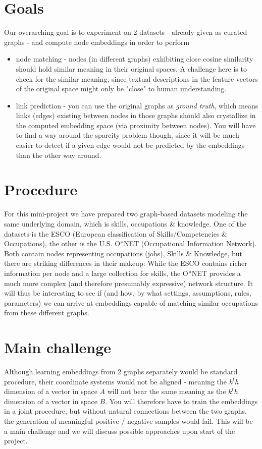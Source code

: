 \documentclass[review]{elsarticle}
\begin{document}
\section{Goals}
\label{sect:goals}

Our overarching goal is to experiment on 2 datasets - already given as curated graphs - and compute node embeddings in order to perform 

\begin{itemize}
  \item node matching - nodes (in different graphs) exhibiting close cosine similarity should hold similar meaning in their original spaces. A challenge here is to check for the similar meaning, since textual descriptions in the feature vectors of the original space might only be "close" to human understanding.
  \item link prediction - you can use the original graphs as \textit{ground truth}, which means links (edges) existing between nodes in those graphs should also crystallize in the computed embedding space (via proximity between nodes). You will have to find a way around the sparcity problem though, since it will be much easier to detect if a given edge would not be predicted by the embeddings than the other way around.
\end{itemize}


\section{Procedure}
\label{sect:procedure}

For this mini-project we have prepared two graph-based datasets modeling the same underlying domain, which is skills, occupations \& knowledge. One of the datasets is the ESCO (European classification of Skills/Competencies \& Occupations), the other is the U.S. O*NET (Occupational Information Network). Both contain nodes representing occupations (jobs), Skills \& Knowledge, but there are striking differences in their makeup: While the ESCO contains richer information per node and a large collection for skills, the O*NET provides a much more complex (and therefore presumably expressive) network structure. It will thus be interesting to see if (and how, by what settings, assumptions, rules, parameters) we can arrive at embeddings capable of matching similar occupations from these different graphs.

\section{Main challenge}
\label{sect:challenge}

Although learning embeddings from 2 graphs separately would be standard procedure, their coordinate systems would not be aligned - meaning the $k^th$ dimension of a vector in space $A$ will not bear the same meaning as the $k^th$ dimension of a vector in space $B$. You will therefore have to train the embeddings in a joint procedure, but without natural connections between the two graphs, the generation of meaningful positive / negative samples would fail. This will be a main challenge and we will discuss possible approaches upon start of the project.


\end{document}
